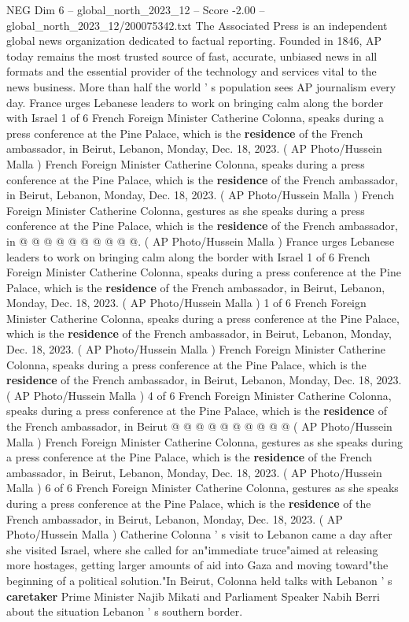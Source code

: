 \begin{textsample}{NEG Dim 6 – global\_north\_2023\_12 – Score -2.00 – global\_north\_2023\_12/200075342.txt}  \label{ex:f6_neg_317}
The Associated Press is an independent global news organization dedicated to factual reporting.
Founded in 1846, AP today remains the most trusted source of fast, accurate, unbiased news in all formats and the essential provider of the technology and services vital to the news business.
More than half the world ' s population sees AP journalism every day.
France urges Lebanese leaders to work on bringing calm along the border with Israel 1 of 6 French Foreign Minister Catherine Colonna, speaks during a press conference at the Pine Palace, which is the \textbf{residence} of the French ambassador, in Beirut, Lebanon, Monday, Dec. 18, 2023. ( AP Photo/Hussein Malla ) French Foreign Minister Catherine Colonna, speaks during a press conference at the Pine Palace, which is the \textbf{residence} of the French ambassador, in Beirut, Lebanon, Monday, Dec. 18, 2023. ( AP Photo/Hussein Malla ) French Foreign Minister Catherine Colonna, gestures as she speaks during a press conference at the Pine Palace, which is the \textbf{residence} of the French ambassador, in @ @ @ @ @ @ @ @ @ @. ( AP Photo/Hussein Malla ) France urges Lebanese leaders to work on bringing calm along the border with Israel 1 of 6 French Foreign Minister Catherine Colonna, speaks during a press conference at the Pine Palace, which is the \textbf{residence} of the French ambassador, in Beirut, Lebanon, Monday, Dec. 18, 2023. ( AP Photo/Hussein Malla ) 1 of 6 French Foreign Minister Catherine Colonna, speaks during a press conference at the Pine Palace, which is the \textbf{residence} of the French ambassador, in Beirut, Lebanon, Monday, Dec. 18, 2023. ( AP Photo/Hussein Malla ) French Foreign Minister Catherine Colonna, speaks during a press conference at the Pine Palace, which is the \textbf{residence} of the French ambassador, in Beirut, Lebanon, Monday, Dec. 18, 2023. ( AP Photo/Hussein Malla ) 4 of 6 French Foreign Minister Catherine Colonna, speaks during a press conference at the Pine Palace, which is the \textbf{residence} of the French ambassador, in Beirut @ @ @ @ @ @ @ @ @ @ ( AP Photo/Hussein Malla ) French Foreign Minister Catherine Colonna, gestures as she speaks during a press conference at the Pine Palace, which is the \textbf{residence} of the French ambassador, in Beirut, Lebanon, Monday, Dec. 18, 2023. ( AP Photo/Hussein Malla ) 6 of 6 French Foreign Minister Catherine Colonna, gestures as she speaks during a press conference at the Pine Palace, which is the \textbf{residence} of the French ambassador, in Beirut, Lebanon, Monday, Dec. 18, 2023. ( AP Photo/Hussein Malla ) Catherine Colonna ' s visit to Lebanon came a day after she visited Israel, where she called for an"immediate truce"aimed at releasing more hostages, getting larger amounts of aid into Gaza and moving toward"the beginning of a political solution."In Beirut, Colonna held talks with Lebanon ' s \textbf{caretaker} Prime Minister Najib Mikati and Parliament Speaker Nabih Berri about the situation Lebanon ' s southern border.

\end{textsample}

